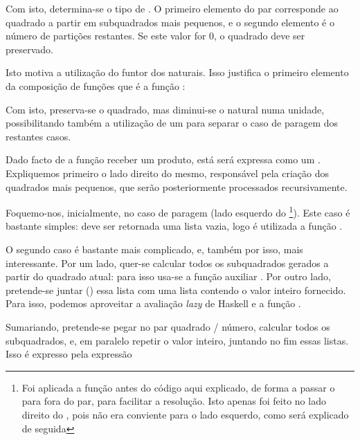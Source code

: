 \documentclass[a4paper]{article}
\begin{document}
Com isto, determina-se o tipo de . O primeiro elemento do par corresponde ao quadrado a partir em subquadrados mais pequenos, e o segundo elemento é o número de partições restantes. Se este valor for 0, o quadrado deve ser preservado. 

Isto motiva a utilização do funtor dos naturais. Isso justifica o primeiro elemento da composição de funções que é a função :


Com isto, preserva-se o quadrado, mas diminui-se o natural numa unidade, possibilitando também a utilização de um  para separar o caso de paragem dos restantes casos.

Dado facto de a função receber um produto, está será expressa como um . Expliquemos primeiro o lado direito do mesmo, responsável pela criação dos quadrados mais pequenos, que serão posteriormente processados recursivamente.

Foquemo-nos, inicialmente, no caso de paragem (lado esquerdo do \footnote{Foi aplicada a função  antes do código aqui explicado, de forma a passar o  para fora do par, para facilitar a resolução. Isto apenas foi feito no lado direito do , pois não era conviente para o lado esquerdo, como será explicado de seguida}). Este caso é bastante simples: deve ser retornada uma lista vazia, logo é utilizada a função .

O segundo caso é bastante mais complicado, e, também por isso, mais interessante. Por um lado, quer-se calcular todos os subquadrados gerados a partir do quadrado atual: para isso usa-se a função auxiliar . Por outro lado, pretende-se juntar () essa lista com uma lista contendo o valor inteiro fornecido. Para isso, podemos aproveitar a avaliação \textit{lazy} de Haskell e a função .

Sumariando, pretende-se pegar no par quadrado / número, calcular todos os subquadrados, e, em paralelo repetir o valor inteiro, juntando no fim essas listas. Isso é expresso pela expressão

\end{document}
